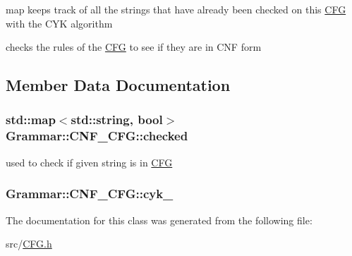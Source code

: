 map keeps track of all the strings that have already been checked on this \hyperlink{classGrammar_1_1CFG}{\-C\-F\-G} with the \-C\-Y\-K algorithm 

checks the rules of the \hyperlink{classGrammar_1_1CFG}{\-C\-F\-G} to see if they are in \-C\-N\-F form 

\subsection{\-Member \-Data \-Documentation}
\hypertarget{classGrammar_1_1CNF__CFG_abb38d3a65837a1d8cf85e3b0e7a1cf15}{
\subsubsection[{checked}]{\setlength{\rightskip}{0pt plus 5cm}std\-::map$<$std\-::string, bool$>$ {\bf \-Grammar\-::\-C\-N\-F\-\_\-\-C\-F\-G\-::checked}}}\label{dc/d05/classGrammar_1_1CNF__CFG_abb38d3a65837a1d8cf85e3b0e7a1cf15}


used to check if given string is in \hyperlink{classGrammar_1_1CFG}{\-C\-F\-G} 

\hypertarget{classGrammar_1_1CNF__CFG_ae65bc2d3253161b23e6cdbfc6a40a475}{
\subsubsection[{cyk\-\_\-}]{ {\bf \-Grammar\-::\-C\-N\-F\-\_\-\-C\-F\-G\-::cyk\-\_\-}}}\label{dc/d05/classGrammar_1_1CNF__CFG_ae65bc2d3253161b23e6cdbfc6a40a475}


\-The documentation for this class was generated from the following file\-:\begin{DoxyCompactItemize}
\item 
src/\hyperlink{CFG_8h}{\-C\-F\-G.\-h}\end{DoxyCompactItemize}
